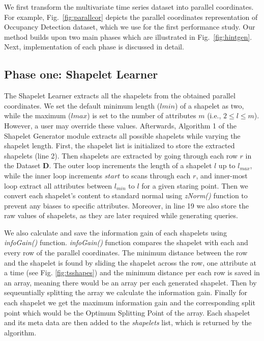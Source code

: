 \documentclass[conference]{IEEEtran}  %
\begin{document}
We first transform the multivariate time series dataset into parallel coordinates. For example, Fig.~\ref{fig:parallcor} depicts the parallel coordinates representation of Occupancy Detection dataset, which we use for the first performance study. Our method builds upon two main phases which are illustrated in Fig.~\ref{fig:hintgen}. Next, implementation of each phase is discussed in detail.


\subsection{Phase one: Shapelet Learner}
The Shapelet Learner extracts all the shapelets from the obtained parallel coordinates. We set the default minimum length ($l{min}$) of a shapelet as two, while the maximum ($l{max}$) is set to the number of attributes $m$ (i.e., $2 \leq l \leq m$). However, a user may override these values. Afterwards, Algorithm 1 of the Shapelet Generator module extracts all possible shapelets while varying the shapelet length. First, the shapelet list is initialized to store the extracted shapelets (line 2). Then shapelets are extracted by going through each row $r$ in the Dataset \textbf{D}. The outer loop increments the length of a shapelet $l$ up to $l_{max}$, while the inner loop increments $start$ to scans through each $r$, and inner-most loop extract all attributes between $l_{min}$ to $l$ for a given staring point. Then we convert each shapelet’s content to standard normal using \textit{zNorm()} function to prevent any biases to specific attributes. Moreover, in line 19 we also store the raw values of shapelets, as they are later required while generating queries. 

We also calculate and save the information gain of each shapelets using \textit{infoGain()} function. \textit{infoGain()} function compares the shapelet with each and every row of the parallel coordinates. The minimum distance between the row and the shapelet is found by sliding the shapelet across the row, one attribute at a time (see Fig. \ref{fig:tsshapes}) and the minimum distance per each row is saved in an array, meaning there would be an array per each generated shapelet. Then by sequeuntially splitting the array we calculate the information gain. Finally for each shapelet we get the maximum information gain and the corresponding split point which would be the Optimum Splitting Point of the array. Each shapelet and its meta data are then added to the \textit{shapelets} list, which is returned by the algorithm.
\end{document}

